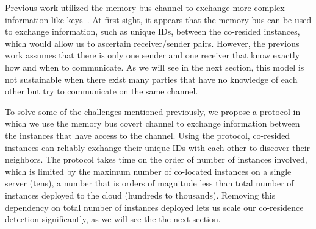 Previous work utilized the memory bus channel to exchange more complex
information like keys~\cite{wuusenix2012}. At first sight, it appears that the
memory bus can be used to exchange information, such as unique IDs, between the
co-resided instances, which would allow us to ascertain receiver/sender pairs.
However, the previous work assumes that there is only one sender and one
receiver that know exactly how and when to communicate. As we will see in the
next section, this model is not sustainable when there exist many parties that
have no knowledge of each other but try to communicate on the same channel.

To solve some of the challenges mentioned previously, we propose a protocol in
which we use the memory bus covert channel to exchange information between the
instances that have access to the channel. Using the protocol, co-resided
instances can reliably exchange their unique IDs with each other to discover
their neighbors. The protocol takes time on the order of number of instances
involved, which is limited by the maximum number of co-located instances on a
single server (tens), a number that is orders of magnitude less than total
number of instances deployed to the cloud (hundreds to thousands). Removing 
this dependency on total number of instances deployed lets us
scale our co-residence detection significantly, as we will see the the next
section.
